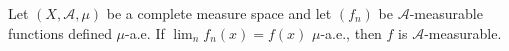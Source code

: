 Let $(X, \mathcal{A}, \mu)$ be a complete measure space and let $(f_n)$ be $\mathcal{A}$-measurable functions defined $\mu$-a.e. If $\lim_n f_n(x) = f(x)$ $\mu$-a.e., then $f$ is $\mathcal{A}$-measurable.
